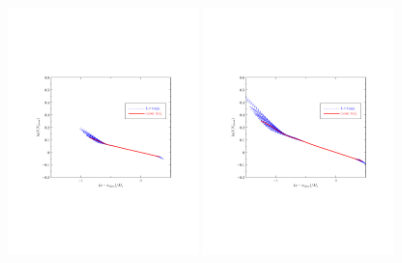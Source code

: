 \documentclass[11pt]{article}
\def \halffigwidth{0.45\textwidth}
\begin{document}
\begin{figure}
  \includegraphics[width=\halffigwidth,  trim = 1in 2.9in 1in 2.9in]{nobicep_spline0_p11_r0d1_potential_traj.pdf}
  \includegraphics[width=\halffigwidth,  trim = 1in 2.9in 1in 2.9in]{nobicep_spline0_p11_r0d2_potential_traj.pdf}%

\end{figure}
\end{document}
